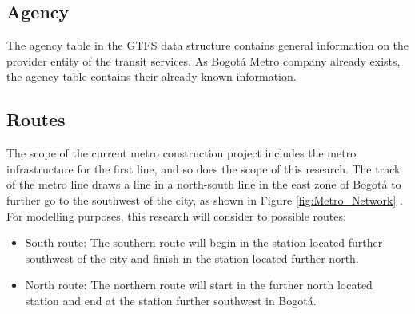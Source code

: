 \documentclass[12pt, a4paper]{report}
\begin{document}
\subsection{Agency}

The agency table in the GTFS data structure contains general information on the provider entity of the transit services. As Bogotá Metro company already exists, the agency table contains their already known information.


\begin{table}[ht]
\centering
\renewcommand{\arraystretch}{1.5}
\caption{Metro agency table.}
\label{tab:Metro_Agency}
\end{table}

\subsection{Routes}

The scope of the current metro construction project includes the metro infrastructure for the first line, and so does the scope of this research. The track of the metro line draws a line in a north-south line in the east zone of Bogotá to further go to the southwest of the city, as shown in Figure \ref{fig:Metro_Network} . For modelling purposes, this research will consider to possible routes:

\begin{itemize}
\item South route: The southern route will begin in the station located further southwest of the city and finish in the station located further north.
\item North route: The northern route will start in the further north located station and end at the station further southwest in Bogotá.
\end{itemize}

\begin{table}[ht]
\centering
\renewcommand{\arraystretch}{1.5}
\caption{Metro routes table.}
\label{tab:Metro_Routes}
\end{table}
\end{document}
